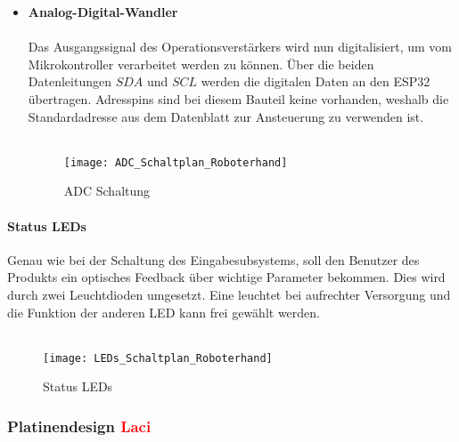 \documentclass[titlepage,12pt,twoside]{article}
\begin{document}
\begin{itemize}
	\item \textbf{Analog-Digital-Wandler} \\
	\\
	Das Ausgangssignal des Operationsverstärkers wird nun digitalisiert, um vom Mikrokontroller verarbeitet werden zu können. Über die beiden Datenleitungen $SDA$ und $SCL$ werden die digitalen Daten an den ESP32 übertragen. 
	Adresspins sind bei diesem Bauteil keine vorhanden, weshalb die Standardadresse aus dem Datenblatt zur Ansteuerung zu verwenden ist. \\
	\\
	\begin{figure}[H]
		\begin{center}
			\scalebox{1.0}
			{\texttt{[image: ADC\_Schaltplan\_Roboterhand]}}
			\caption{ADC Schaltung}
			\label{fig:ADC_Schaltplan_Roboterhand}			
		\end{center}
	\end{figure}
	\hfill \break
\end{itemize}

\paragraph{Status LEDs}
\hfill \break
\hfill \break
Genau wie bei der Schaltung des Eingabesubsystems, soll den Benutzer des Produkts ein optisches Feedback über wichtige Parameter bekommen. Dies wird durch zwei Leuchtdioden umgesetzt. Eine leuchtet bei aufrechter Versorgung und die
Funktion der anderen LED kann frei gewählt werden. \\
\\
\begin{figure}[H]
	\begin{center}
		\scalebox{0.8}
		{\texttt{[image: LEDs\_Schaltplan\_Roboterhand]}}
		\caption{Status LEDs}
		\label{fig:LEDs_Schaltplan_Roboterhand}		
	\end{center}
\end{figure}
\hfill \break

\subsubsection{Platinendesign \textcolor{red}{Laci}}
\label{chap:Platinendesign Roboterhand}
\end{document}
